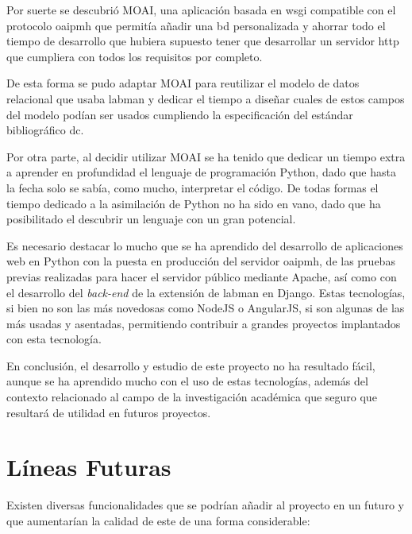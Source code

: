 Por suerte se descubrió MOAI, una aplicación basada en \acrshort{wsgi} compatible con el protocolo \acrshort{oaipmh} que permitía añadir una \acrshort{bd} personalizada y ahorrar todo el tiempo de desarrollo que hubiera supuesto tener que desarrollar un servidor \acrshort{http} que cumpliera con todos los requisitos por completo.

De esta forma se pudo adaptar MOAI para reutilizar el modelo de datos relacional que usaba \acrshort{labman} y dedicar el tiempo a diseñar cuales de estos campos del modelo podían ser usados cumpliendo la especificación del estándar bibliográfico \acrshort{dc}.

Por otra parte, al decidir utilizar MOAI se ha tenido que dedicar un tiempo extra a aprender en profundidad el lenguaje de programación Python, dado que hasta la fecha solo se sabía, como mucho, interpretar el código. De todas formas el tiempo dedicado a la asimilación de Python no ha sido en vano, dado que ha posibilitado el descubrir un lenguaje con un gran potencial.

Es necesario destacar lo mucho que se ha aprendido del desarrollo de aplicaciones web en Python con la puesta en producción del servidor \acrshort{oaipmh}, de las pruebas previas realizadas para hacer el servidor público mediante Apache, así como con el desarrollo del \textit{back-end} de la extensión de \acrshort{labman} en Django. Estas tecnologías, si bien no son las más novedosas como NodeJS\cite{NodeJS} o AngularJS\cite{AngularJS}, si son algunas de las más usadas y asentadas, permitiendo contribuir a grandes proyectos implantados con esta tecnología.

En conclusión, el desarrollo y estudio de este proyecto no ha resultado fácil, aunque se ha aprendido mucho con el uso de estas tecnologías, además del contexto relacionado al campo de la investigación académica que seguro que resultará de utilidad en futuros proyectos.

\section{Líneas Futuras}\label{sec:future_lines}

Existen diversas funcionalidades que se podrían añadir al proyecto en un futuro y que aumentarían la calidad de este de una forma considerable:

